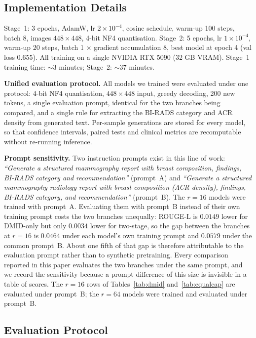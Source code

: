 \documentclass{wlscirep}
\begin{document}
\subsection*{Implementation Details}

Stage~1: 3 epochs, AdamW, lr $2 \times 10^{-4}$, cosine schedule, warm-up 100 steps, batch 8, images $448 \times 448$, 4-bit NF4 quantisation. Stage~2: 5 epochs, lr $1 \times 10^{-4}$, warm-up 20 steps, batch 1 $\times$ gradient accumulation 8, best model at epoch 4 (val loss 0.655). All training on a single NVIDIA RTX 5090 (32 GB VRAM). Stage~1 training time: $\sim$3 minutes; Stage~2: $\sim$37 minutes.

\textbf{Unified evaluation protocol.} All models we trained were evaluated under one protocol: 4-bit NF4 quantisation, $448\times448$ input, greedy decoding, 200 new tokens, a single evaluation prompt, identical for the two branches being compared, and a single rule for extracting the BI-RADS category and ACR density from generated text. Per-sample generations are stored for every model, so that confidence intervals, paired tests and clinical metrics are recomputable without re-running inference.

\textbf{Prompt sensitivity.} Two instruction prompts exist in this line of work: \emph{``Generate a structured mammography report with breast composition, findings, BI-RADS category and recommendation''} (prompt~A) and \emph{``Generate a structured mammography radiology report with breast composition (ACR density), findings, BI-RADS category, and recommendation''} (prompt~B). The $r=16$ models were trained with prompt~A. Evaluating them with prompt~B instead of their own training prompt costs the two branches unequally: ROUGE-L is $0.0149$ lower for DMID-only but only $0.0034$ lower for two-stage, so the gap between the branches at $r=16$ is $0.0464$ under each model's own training prompt and $0.0579$ under the common prompt~B. About one fifth of that gap is therefore attributable to the evaluation prompt rather than to synthetic pretraining. Every comparison reported in this paper evaluates the two branches under the same prompt, and we record the sensitivity because a prompt difference of this size is invisible in a table of scores. The $r=16$ rows of Tables~\ref{tab:dmid} and~\ref{tab:equalcap} are evaluated under prompt~B; the $r=64$ models were trained and evaluated under prompt~B.

\subsection*{Evaluation Protocol}
\end{document}
